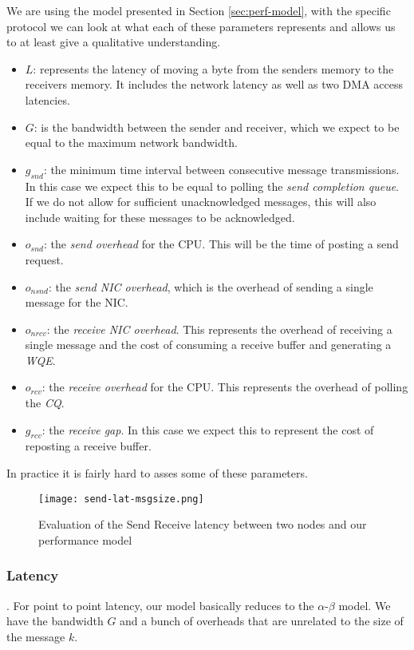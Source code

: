 We are using the model presented in Section \ref{sec:perf-model}, with the specific protocol 
we can look at what each of these parameters represents and allows us to at least give a qualitative understanding.


\begin{itemize}
  \item $L$: represents the latency of moving a byte from the senders memory to the receivers memory. It includes the 
    network latency as well as two DMA access latencies.
  \item $G$: is the bandwidth between the sender and receiver, which we expect to be equal to the maximum network bandwidth.
  \item $g_{snd}$: the minimum time interval between consecutive message transmissions. In this case we expect this to be 
    equal to polling the \emph{send completion queue}. If we do not allow for sufficient unacknowledged messages, this will
    also include waiting for these messages to be acknowledged.
  \item $o_{snd}$: the \emph{send overhead} for the CPU. This will be the time of posting a send request.
  \item $o_{nsnd}$: the \emph{send NIC overhead}, which is the overhead of sending a single message for the NIC.
  \item $o_{nrcv}$: the \emph{receive NIC overhead}. This represents the overhead of receiving a single message and the cost of 
    consuming a receive buffer and generating a \emph{WQE}.
  \item $o_{rcv}$: the \emph{receive overhead} for the CPU. This represents the overhead of polling the \emph{CQ}.
  \item $g_{rcv}$: the \emph{receive gap}. In this case we expect this to represent the cost of reposting a receive buffer.
\end{itemize}


In practice it is fairly hard to asses some of these parameters. 


\begin{figure}[h]
\texttt{[image: send-lat-msgsize.png]}
\caption{Evaluation of the Send Receive latency between two nodes and our performance model}
\label{fig:plot-sndrcv-lat}
\end{figure}

\subsubsection{Latency} . For point to point latency, our model basically reduces to the $\alpha$-$\beta$ model. We
have the bandwidth $G$ and a bunch of overheads that are unrelated to the size of the message $k$.

